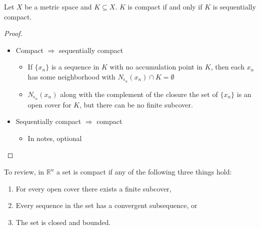 \documentclass[compress]{beamer}
\def\R{\mathbb{R}}
\begin{document}
\begin{frame}
  \begin{theorem}
    Let $X$ be a metric space and $K \subseteq X$. $K$ is compact if and
    only if $K$ is sequentially compact. 
  \end{theorem}
  \begin{proof}
    \begin{itemize}
    \item Compact $\Rightarrow$ sequentially compact
      \begin{itemize}
      \item  If $\{x_n\}$ is a sequence in $K$ with no
        accumulation point in $K$, then each $x_n$ has some neighborhood
        with $N_{\epsilon_n}(x_n) \cap K = \emptyset$
      \item $N_{\epsilon_n}(x_n)$ along with the complement of the closure the
        set of $\{x_n\}$ is an open cover for $K$, but there can be no
        finite subcover.
      \end{itemize}
    \item Sequentially compact $\Rightarrow$ compact
      \begin{itemize}
      \item In notes, optional
      \end{itemize}
    \end{itemize}
  \end{proof}
\end{frame}

\begin{frame}
  To review, in $\R^n$ a set is compact if any of the following three
  things hold:
  \begin{enumerate}
  \item For every open cover there exists a finite subcover,
  \item Every sequence in the set has a convergent subsequence, or
  \item The set is closed and bounded.
  \end{enumerate}
\end{frame}
\end{document}
